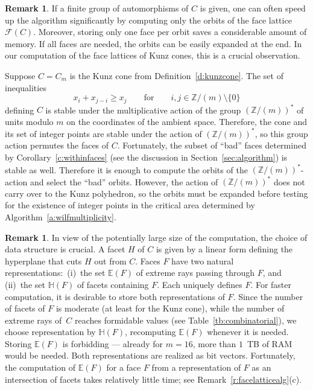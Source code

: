 \documentclass[12pt]{amsart}
\theoremstyle{definition}
\newtheorem{remark}[thm]{Remark}
\numberwithin{equation}{section}
\newcommand{\ring}[1]{\ensuremath{\mathbb{#1}}}
\renewcommand\>{\rangle}
\newcommand\<{\langle}
\newcommand\0{\mathbf{0}}
\newcommand\ZZ{\ring{Z}}
\def\EE{{\mathbb E}}
\def\HH{{\mathbb H}}
\def\cF{{\mathcal F}}
\begin{document}
\begin{remark}\label{r:automorphism}
If a finite group of automorphisms of $C$ is given, one can often speed up the algorithm significantly by computing only the orbits of the face lattice $\cF(C)$.  Moreover, storing only one face per orbit saves a considerable amount of memory.  If all faces are needed, the orbits can be easily expanded at the end.  In our computation of the face lattices of Kunz cones, this is a crucial observation.  

Suppose $C = C_m$ is the Kunz cone from Definition~\ref{d:kunzcone}.  The set of inequalities 
\[
x_i + x_{j-i} \ge x_j \qquad \text{for} \qquad i,j \in \ZZ/(m) \setminus \{0\}
\]
defining $C$ is stable under the multiplicative action of the group $(\ZZ/(m))^*$ of units modulo $m$ on the coordinates of the ambient space. Therefore, the cone and its set of integer points are stable under the action of $(\ZZ/(m))^*$, so this group action permutes the faces of $C$.  Fortunately, the subset of ``bad'' faces determined by Corollary~\ref{c:withinfaces} (see the discussion in Section~\ref{sec:algorithm}) is stable as well. Therefore it is enough to compute the orbits of the $(\ZZ/(m))^*$-action and select the ``bad'' orbits. However, the action of $(\ZZ/(m))^*$ does not carry over to the Kunz polyhedron, so the orbits must be expanded before testing for the existence of integer points in the critical area determined by Algorithm~\ref{a:wilfmultiplicity}.
\end{remark}

\begin{remark}\label{r:datastructure}
In view of the potentially large size of the computation, the choice of data structure is crucial. A facet $H$ of $C$ is given by a linear form defining the hyperplane that cuts $H$ out from $C$.  Faces $F$ have two natural representations:\ (i)~the set $\EE(F)$ of extreme rays passing through $F$, and (ii)~the set $\HH(F)$ of facets containing $F$.  Each uniquely defines $F$.  For faster computation, it is desirable to store both representations of $F$.  Since the number of facets of $F$ is moderate (at least for the Kunz cone), while the number of extreme rays of~$C$ reaches formidable values (see Table~\ref{tb:combinatorial}), we choose representation by $\HH(F)$, recomputing $\EE(F)$ whenever it is needed.  Storing $\EE(F)$ is forbidding --- already for $m = 16$, more than $1$~TB of RAM would be needed. Both representations are realized as bit vectors.  Fortunately, the computation of $\EE(F)$ for a face $F$ from a representation of $F$ as an intersection of facets takes relatively little time; see Remark~\ref{r:facelatticealg}(c).
\end{remark}
\end{document}
